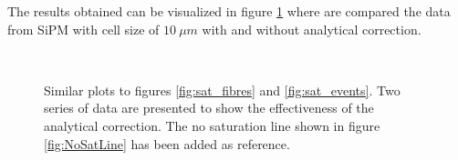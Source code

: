 The results obtained can be visualized in figure \ref{fig:sat_corr} where are compared the data from SiPM with cell size of $10\ \mu m$ with and without analytical correction.


\begin{figure}
	\centering
	\quad
	\\
	 \quad
	\caption{Similar plots to figures \ref{fig:sat_fibres} and \ref{fig:sat_events}. Two series of data are presented to show the effectiveness of the analytical correction. The no saturation line shown in figure \ref{fig:NoSatLine} has been added as reference. }
	\label{fig:sat_corr}
\end{figure}

